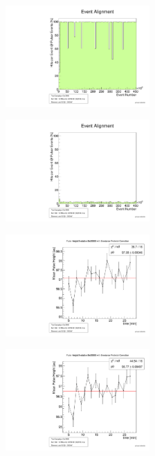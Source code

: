 \documentclass[9pt]{beamer}
\begin{document}
\begin{frame}
	\begin{minipage}{5.5cm}
		\centering
		\includegraphics[angle=270, width=5.5cm]{EventAlignment396}
	\end{minipage}
	\hspace*{2pt}
	\begin{minipage}{5.5cm}
		\centering
		\includegraphics[angle=270, width=5.5cm]{EventAlignment396a}
	\end{minipage}\s
\end{frame}
\begin{frame}
	\begin{minipage}{5.5cm}
		\centering
		\includegraphics[angle=270, width=5.5cm]{PulseHeight20000396}
	\end{minipage}
	\hspace*{2pt}
	\begin{minipage}{5.5cm}
		\centering
		\includegraphics[angle=270, width=5.5cm]{PulseHeight20000396a}
	\end{minipage}\s
\end{frame}
\end{document}
